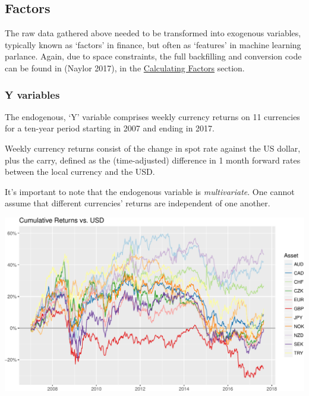 \documentclass[]{article}
\newenvironment{Shaded}{\begin{snugshade}}{\end{snugshade}}
\newcommand{\KeywordTok}[1]{\textcolor[rgb]{0.13,0.29,0.53}{\textbf{#1}}}
\newcommand{\DataTypeTok}[1]{\textcolor[rgb]{0.13,0.29,0.53}{#1}}
\newcommand{\DecValTok}[1]{\textcolor[rgb]{0.00,0.00,0.81}{#1}}
\newcommand{\StringTok}[1]{\textcolor[rgb]{0.31,0.60,0.02}{#1}}
\newcommand{\ControlFlowTok}[1]{\textcolor[rgb]{0.13,0.29,0.53}{\textbf{#1}}}
\newcommand{\OperatorTok}[1]{\textcolor[rgb]{0.81,0.36,0.00}{\textbf{#1}}}
\newcommand{\NormalTok}[1]{#1}
\begin{document}
\begin{Shaded}
\end{Shaded}

\subsection{Factors}\label{factors}

The raw data gathered above needed to be transformed into exogenous
variables, typically known as `factors' in finance, but often as
`features' in machine learning parlance. Again, due to space
constraints, the full backfilling and conversion code can be found in
(Naylor 2017), in the
\href{https://charlesnaylor.github.io/gp_regression/doc/Calculating_Factors.html}{Calculating
Factors} section.

\subsubsection{Y variables}\label{y-variables}

The endogenous, `Y' variable comprises weekly currency returns on 11
currencies for a ten-year period starting in 2007 and ending in 2017.

Weekly currency returns consist of the change in spot rate against the
US dollar, plus the carry, defined as the (time-adjusted) difference in
1 month forward rates between the local currency and the USD.

It's important to note that the endogenous variable is
\emph{multivariate}. One cannot assume that different currencies'
returns are independent of one another.

\includegraphics{Econometric_FX_Forecasting_files/figure-latex/graph_endos-1.pdf}
\end{document}
